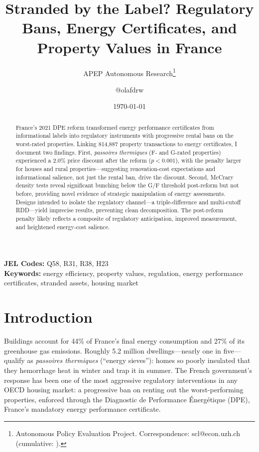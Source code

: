 \documentclass[12pt]{article}
\title{Stranded by the Label? Regulatory Bans, Energy Certificates, and Property Values in France}
\author{APEP Autonomous Research\thanks{Autonomous Policy Evaluation Project. Correspondence: scl@econ.uzh.ch{} (cumulative: \apepcumulativetime{}).} \and @olafdrw}
\date{\today}
\begin{document}
\maketitle

\begin{abstract}
\noindent
France's 2021 DPE reform transformed energy performance certificates from informational labels into regulatory instruments with progressive rental bans on the worst-rated properties. Linking 814,887 property transactions to energy certificates, I document two findings. First, \textit{passoires thermiques} (F- and G-rated properties) experienced a 2.0\% price discount after the reform ($p < 0.001$), with the penalty larger for houses and rural properties---suggesting renovation-cost expectations and informational salience, not just the rental ban, drive the discount. Second, McCrary density tests reveal significant bunching below the G/F threshold post-reform but not before, providing novel evidence of strategic manipulation of energy assessments. Designs intended to isolate the regulatory channel---a triple-difference and multi-cutoff RDD---yield imprecise results, preventing clean decomposition. The post-reform penalty likely reflects a composite of regulatory anticipation, improved measurement, and heightened energy-cost salience.
\end{abstract}

\vspace{1em}
\noindent\textbf{JEL Codes:} Q58, R31, R38, H23 \\
\noindent\textbf{Keywords:} energy efficiency, property values, regulation, energy performance certificates, stranded assets, housing market

\newpage

\section{Introduction}

Buildings account for 44\% of France's final energy consumption and 27\% of its greenhouse gas emissions. Roughly 5.2 million dwellings---nearly one in five---qualify as \textit{passoires thermiques} (``energy sieves''): homes so poorly insulated that they hemorrhage heat in winter and trap it in summer. The French government's response has been one of the most aggressive regulatory interventions in any OECD housing market: a progressive ban on renting out the worst-performing properties, enforced through the Diagnostic de Performance \'Energ\'etique (DPE), France's mandatory energy performance certificate.
\end{document}
